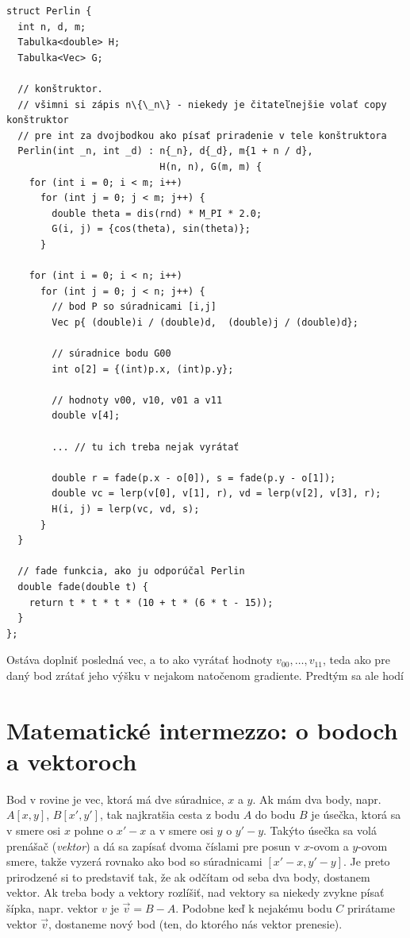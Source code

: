 \begin{lstlisting}
struct Perlin {
  int n, d, m;  
  Tabulka<double> H;
  Tabulka<Vec> G;

  // konštruktor. 
  // všimni si zápis n\{\_n\} - niekedy je čitateľnejšie volať copy konštruktor 
  // pre int za dvojbodkou ako písať priradenie v tele konštruktora
  Perlin(int _n, int _d) : n{_n}, d{_d}, m{1 + n / d}, 
                           H(n, n), G(m, m) {
    for (int i = 0; i < m; i++)
      for (int j = 0; j < m; j++) {
        double theta = dis(rnd) * M_PI * 2.0;
        G(i, j) = {cos(theta), sin(theta)};
      }

    for (int i = 0; i < n; i++)
      for (int j = 0; j < n; j++) {
        // bod P so súradnicami [i,j]
        Vec p{ (double)i / (double)d,  (double)j / (double)d};

        // súradnice bodu G00
        int o[2] = {(int)p.x, (int)p.y}; 

        // hodnoty v00, v10, v01 a v11
        double v[4];

        ... // tu ich treba nejak vyrátať
        
        double r = fade(p.x - o[0]), s = fade(p.y - o[1]);
        double vc = lerp(v[0], v[1], r), vd = lerp(v[2], v[3], r);
        H(i, j) = lerp(vc, vd, s);
      }
  }

  // fade funkcia, ako ju odporúčal Perlin
  double fade(double t) {
    return t * t * t * (10 + t * (6 * t - 15));
  }
};
\end{lstlisting}


Ostáva doplniť posledná vec, a to ako vyrátať hodnoty $v_{00},\ldots,v_{11}$,
teda ako pre daný bod zrátať jeho výšku v nejakom natočenom gradiente. 
Predtým sa ale hodí

\section*{Matematické intermezzo: o bodoch a vektoroch}
\label{mat.body}

Bod v rovine je vec, ktorá má dve súradnice, $x$ a $y$. Ak mám dva body, napr.
$A[x,y]$, $B[x',y']$, tak najkratšia cesta z bodu $A$ do bodu $B$ je úsečka, ktorá
sa v smere osi $x$ pohne o $x'-x$ a v smere osi $y$ o $y'-y$. Takýto úsečka
sa volá prenášač 
({\em vektor}) a dá sa zapísať dvoma číslami pre posun v $x$-ovom
a $y$-ovom smere, takže vyzerá
rovnako ako bod so súradnicami $[x'-x,y'-y]$. Je preto prirodzené
si to predstaviť tak, že ak odčítam od seba dva body, dostanem vektor.
Ak treba body a vektory rozlíšiť, nad vektory sa niekedy
zvykne písať šípka, napr. vektor $v$ je $\vec v = B-A$. 
Podobne keď k nejakému bodu $C$ prirátame vektor $\vec v$, 
dostaneme nový bod (ten, do ktorého nás
vektor prenesie).


